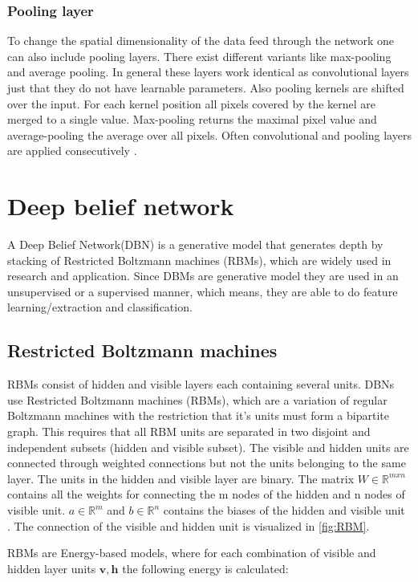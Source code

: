 \subsubsection{Pooling layer}
To change the spatial dimensionality of the data feed through the network one can also include pooling layers. There exist different variants like max-pooling and average pooling. In general these layers work identical as convolutional layers just that they do not have learnable parameters. Also pooling kernels are shifted over the input. For each kernel position all pixels covered by the kernel are merged to a single value. Max-pooling returns the maximal pixel value and average-pooling the average over all pixels. Often convolutional and pooling layers are applied consecutively \cite{OShea2015}.


\section{Deep belief network}

A Deep Belief Network(DBN) is a generative model that generates depth by stacking of Restricted Boltzmann machines (RBMs), which are widely used in research and application. Since DBMs are generative model they are used in an unsupervised or a supervised manner, which means, they are able to do feature learning/extraction and classification.

\subsection{Restricted Boltzmann machines}
RBMs consist of hidden and visible layers each containing several units. DBNs use Restricted Boltzmann machines (RBMs), which are a variation of regular Boltzmann machines with the restriction that it's units must form a bipartite graph. This requires that all RBM units are separated in two disjoint and independent subsets (hidden and visible subset). The visible and hidden units are connected through weighted connections but not the units belonging to the same layer. The units in the hidden and visible layer are binary. The matrix $W \in \mathbb{R}^{mxn}$ contains all the weights for connecting the m nodes of the hidden and n nodes of visible unit. $a \in \mathbb{R}^{m}$ and $b \in \mathbb{R}^{n}$ contains the biases of the hidden and visible unit \cite{Hinton2010}. The connection of the visible and hidden unit is visualized in \ref{fig:RBM}.

RBMs are Energy-based models, where for each combination of visible and hidden layer units $\mathbf{v,h}$ the following energy is calculated:

